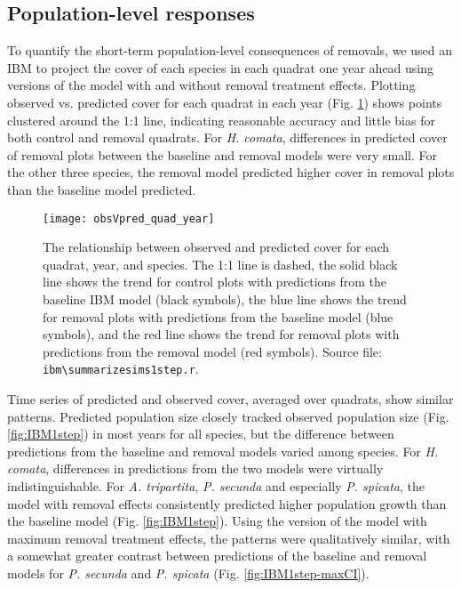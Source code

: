 \documentclass[11pt]{article}
\begin{document}
\begin{doublespacing}
\subsection*{Population-level responses}

To quantify the short-term population-level consequences of removals, we used an IBM to project the cover of each species in each quadrat one year ahead using versions of the model with and without removal treatment effects. Plotting observed vs. predicted cover for each quadrat in each year (Fig. \ref{fig:obsVpred}) shows points clustered around the 1:1 line, indicating reasonable accuracy and little bias for both control and removal quadrats. For \textit{H. comata}, differences in predicted cover of removal plots between the baseline and removal models were very small. For the other three species, the removal model predicted higher cover in removal plots than the baseline model predicted.

 \begin{figure}[tbp]
 \centering
 \texttt{[image: obsVpred\_quad\_year]}
 \caption{The relationship between observed and predicted cover for each quadrat, year, and species. The 1:1 line is dashed, the solid black line shows the trend for control plots with predictions from the baseline IBM model (black symbols), the blue line shows the trend for removal plots with predictions from the baseline model (blue symbols), and the red line shows the trend for removal plots with predictions from the removal model (red symbols). Source file: \texttt{ibm\textbackslash summarize\textunderscore sims1step.r}. }
 \label{fig:obsVpred}
 \end{figure}
 
Time series of predicted and observed cover, averaged over quadrats, show similar patterns. Predicted population size closely tracked observed population size (Fig. \ref{fig:IBM1step}) in most years for all species, but the difference between predictions from the baseline and removal models varied among species. For \textit{H. comata}, differences in predictions from the two models were virtually indistinguishable. For \textit{A. tripartita}, \textit{P. secunda} and especially \textit{P. spicata}, the model with removal effects consistently predicted higher population growth than the baseline model (Fig. \ref{fig:IBM1step}). Using the version of the model with maximum removal treatment effects, the patterns were qualitatively similar, with a somewhat greater contrast between predictions of the baseline and removal models for \textit{P. secunda} and \textit{P. spicata} (Fig. \ref{fig:IBM1step-maxCI}). 


\end{doublespacing}
\end{document}

